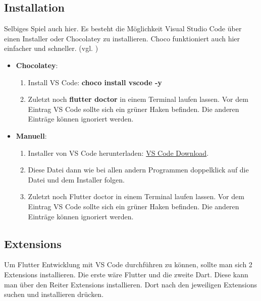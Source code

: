\subsection{Installation}
Selbiges Spiel auch hier. Es besteht die Möglichkeit Visual Studio Code über einen Installer oder Chocolatey zu installieren. Choco funktioniert auch hier einfacher und schneller. (vgl. \cite{VS-Code-Install})
\begin{itemize}
    \item \textbf{Chocolatey}:
    \begin{enumerate}
        \item Install VS Code: \textbf{choco install vscode -y}
        \item Zuletzt noch \textbf{flutter doctor} in einem Terminal laufen lassen. Vor dem Eintrag VS Code sollte sich ein grüner Haken befinden. Die anderen Einträge können ignoriert werden.
    \end{enumerate}
    
    \item \textbf{Manuell}:
    \begin{enumerate}
        \item Installer von VS Code herunterladen: \href{https://code.visualstudio.com/docs/?dv=win}{VS Code Download}.
        \item Diese Datei dann wie bei allen andern Programmen doppelklick auf die Datei und dem Installer folgen.
        \item Zuletzt noch Flutter doctor in einem Terminal laufen lassen. Vor dem Eintrag VS Code sollte sich ein grüner Haken befinden. Die anderen Einträge können ignoriert werden.
    \end{enumerate}
\end{itemize}

\newpage

\subsection{Extensions}
Um Flutter Entwicklung mit VS Code durchführen zu können, sollte man sich 2 Extensions installieren. Die erste wäre Flutter und die zweite Dart. Diese kann man über den Reiter Extensions installieren. Dort nach den jeweiligen Extensions suchen und installieren drücken.

